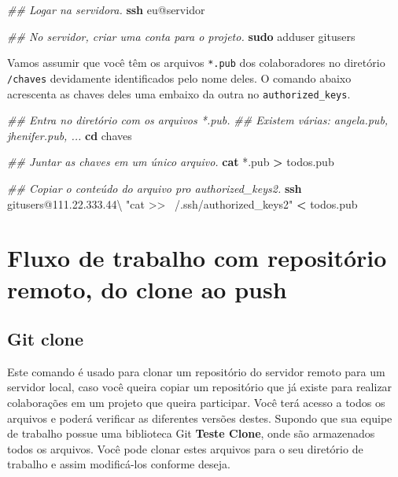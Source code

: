 \documentclass[
  a5paper,
  pagesize,
  9pt,
  pointlessnumbers,
  normalheadings,
  twoside=false
]{book}
\newenvironment{Shaded}{\begin{snugshade}}{\end{snugshade}}
\newcommand{\KeywordTok}[1]{\textcolor[rgb]{0.13,0.29,0.53}{\textbf{{#1}}}}
\newcommand{\StringTok}[1]{\textcolor[rgb]{0.31,0.60,0.02}{{#1}}}
\newcommand{\CommentTok}[1]{\textcolor[rgb]{0.56,0.35,0.01}{\textit{{#1}}}}
\newcommand{\NormalTok}[1]{{#1}}
\begin{document}
\begin{Shaded}
\begin{Highlighting}[]
\CommentTok{## Logar na servidora.}
\KeywordTok{ssh} \NormalTok{eu@servidor}

\CommentTok{## No servidor, criar uma conta para o projeto.}
\KeywordTok{sudo} \NormalTok{adduser gitusers}
\end{Highlighting}
\end{Shaded}

Vamos assumir que você têm os arquivos \texttt{*.pub} dos colaboradores
no diretório \texttt{/chaves} devidamente identificados pelo nome deles.
O comando abaixo acrescenta as chaves deles uma embaixo da outra no
\texttt{authorized\_keys}.

\begin{Shaded}
\begin{Highlighting}[]
\CommentTok{## Entra no diretório com os arquivos *.pub.}
\CommentTok{## Existem várias: angela.pub, jhenifer.pub, ...}
\KeywordTok{cd} \NormalTok{chaves}

\CommentTok{## Juntar as chaves em um único arquivo.}
\KeywordTok{cat} \NormalTok{*.pub }\KeywordTok{>} \NormalTok{todos.pub}

\CommentTok{## Copiar o conteúdo do arquivo pro authorized_keys2.}
\KeywordTok{ssh} \NormalTok{gitusers@111.22.333.44\textbackslash{}}
  \StringTok{"cat >> ~/.ssh/authorized_keys2"} \KeywordTok{<} \NormalTok{todos.pub}
\end{Highlighting}
\end{Shaded}

\section{Fluxo de trabalho com repositório remoto, do clone ao
push}\label{fluxo-de-trabalho-com-repositorio-remoto-do-clone-ao-push}

\subsection{Git clone}\label{git-clone}

Este comando é usado para clonar um repositório do servidor remoto para
um servidor local, caso você queira copiar um repositório que já existe
para realizar colaborações em um projeto que queira participar. Você
terá acesso a todos os arquivos e poderá verificar as diferentes versões
destes. Supondo que sua equipe de trabalho possue uma biblioteca Git
\textbf{Teste Clone}, onde são armazenados todos os arquivos. Você pode
clonar estes arquivos para o seu diretório de trabalho e assim
modificá-los conforme deseja.
\end{document}
